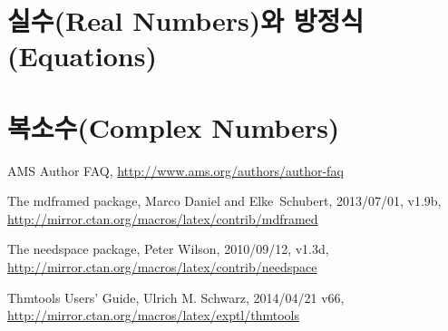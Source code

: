 \documentclass[a4paper, 11pt]{report}
\newcommand{\ntt}{%
  \fontfamily\ttdefault \fontseries\mddefault \fontshape\updefault
  \selectfont
}
\DeclareRobustCommand{\pkg}[1]{{\ntt#1}}
\renewcommand{\<}{\langle}
\renewcommand{\>}{\rangle}
\begin{document}
\section{실수(Real Numbers)와 방정식(Equations)}

\section{복소수(Complex Numbers)} 




\begin{thebibliography}{[MDF]}

\raggedright

 AMS Author FAQ,
  \url{http://www.ams.org/authors/author-faq}

 The \pkg{mdframed} package,
  Marco Daniel and Elke~Schubert, 2013/07/01, v1.9b,
  \url{http://mirror.ctan.org/macros/latex/contrib/mdframed}

 The \pkg{needspace} package,
  Peter Wilson, 2010/09/12, v1.3d,
  \url{http://mirror.ctan.org/macros/latex/contrib/needspace}

 \pkg{Thmtools} Users' Guide,
  Ulrich M. Schwarz, 2014/04/21 v66,
  \url{http://mirror.ctan.org/macros/latex/exptl/thmtools}

\end{thebibliography}
\end{document}
